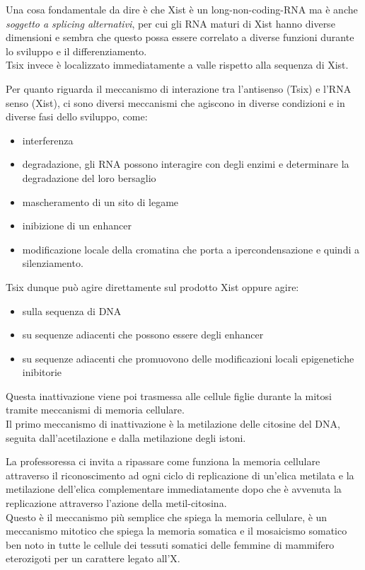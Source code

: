 \documentclass[11pt]{book}
\begin{document}
Una cosa fondamentale da dire è che Xist è un long-non-coding-RNA ma è anche \emph{soggetto a splicing alternativi}, per cui gli RNA maturi di Xist hanno diverse dimensioni e sembra che questo possa essere correlato a diverse funzioni durante lo sviluppo e il differenziamento.\\
Tsix invece è localizzato immediatamente a valle rispetto alla sequenza di Xist.

Per quanto riguarda il meccanismo di interazione tra l’antisenso (Tsix) e l’RNA senso (Xist), ci sono diversi meccanismi che agiscono in diverse condizioni e in diverse fasi dello sviluppo, come:
\begin{itemize}
\item interferenza
\item degradazione, gli RNA possono interagire con degli enzimi e determinare la degradazione del loro bersaglio
\item mascheramento di un sito di legame
\item inibizione di un enhancer
\item modificazione locale della cromatina che porta a ipercondensazione e quindi a silenziamento.
\end{itemize}

Tsix dunque può agire direttamente sul prodotto Xist oppure agire:
\begin{itemize}
\item sulla sequenza di DNA
\item su sequenze adiacenti che possono essere degli enhancer
\item su sequenze adiacenti che promuovono delle modificazioni locali epigenetiche inibitorie
\end{itemize}

Questa inattivazione viene poi trasmessa alle cellule figlie durante la mitosi tramite meccanismi di memoria cellulare.\\
Il primo meccanismo di inattivazione è la metilazione delle citosine del DNA, seguita dall’acetilazione e dalla metilazione degli istoni.

La professoressa ci invita a ripassare come funziona la memoria cellulare attraverso il riconoscimento ad ogni ciclo di replicazione di un’elica metilata e la metilazione dell’elica complementare immediatamente dopo che è avvenuta la replicazione attraverso l’azione della metil-citosina.\\
Questo è il meccanismo più semplice che spiega la memoria cellulare, è un meccanismo mitotico che spiega la memoria somatica e il mosaicismo somatico ben noto in tutte le cellule dei tessuti somatici delle femmine di mammifero eterozigoti per un carattere legato all’X. 
\end{document}
